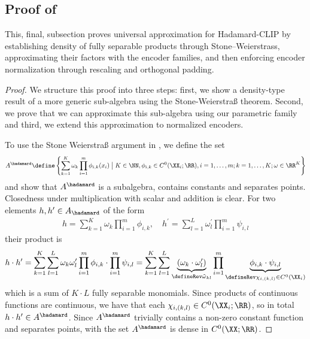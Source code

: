 \documentclass{article}
\begin{document}
\subsection{Proof of }
\label{thm:UniversalApproximationHadamardClip-PROOF}

This, final, subsection proves universal approximation for
Hadamard-CLIP by establishing density of fully separable products through
Stone--Weierstrass, approximating their factors with the encoder families, and
then enforcing encoder normalization through rescaling and orthogonal
padding.
\begin{proof} We structure this proof into three steps: first, we show a density-type result
 of a more generic sub-algebra using the Stone-Weierstraß theorem. Second, we prove
 that we can approximate this sub-algebra using our parametric family and third,
 we extend this approximation to normalized encoders.

  To use the Stone Weierstraß argument in
 , we define the set
 \begin{align*}
  A^{\hadamard} \define \left\{
  \sum_{k=1}^K \omega_k \prod_{i=1}^m  \phi_{i,k}(x_i) \; \big\vert \;
  K\in \NN, \phi_{i,k} \in C^0(\XX_i; \RR), i=1,\ldots, m; k=1,\ldots, K;
  \omega \in \RR^{K}
  \right\}
 \end{align*}
 and show that $A^{\hadamard}$ is a subalgebra, contains constants and separates points.
 Closedness under multiplication with scalar and addition is clear. For two elements
 $h, h^\prime \in A_{\hadamard}$ of the form
 \begin{align*}
  h = \sum_{k=1}^K \omega_k \prod_{i=1}^{m} \phi_{i,k}, \quad
  h^\prime = \sum_{l=1}^{L} \omega_l^\prime \prod_{i=1}^{m} \psi_{i,l}
 \end{align*}
 their product is
 \begin{align*}
  h \cdot h^\prime  = \sum_{k=1}^{K} \sum_{l=1}^{L} \omega_k \omega^\prime_l
  \prod_{i=1}^{m} \phi_{i,k} \cdot \prod_{i=1}^{m}\psi_{i,l}
  = \sum_{k=1}^{K} \sum_{l=1}^{L} \underbrace{(\omega_k
   \cdot \omega_l^\prime)}_{\defineRev \tilde{\omega}_{kl}}
  \prod_{i=1}^{m} \underbrace{\phi_{i,k} \cdot \psi_{i,l}}_{\defineRev \chi_{i, (k,l)}
   \in C^0(\XX_i)}
 \end{align*}
 which is a sum of $K\cdot L$ fully separable monomials. Since products of continuous
 functions are continuous, we have that each $\chi_{i,(k,l)} \in C^0(\XX_i;\RR)$, so
 in total $h \cdot h^\prime \in A^{\hadamard}$. Since $A^{\hadamard}$ trivially
 contains a non-zero constant function and separates points, with
  the set $A^{\hadamard}$ is dense in $C^0(\XX;\RR)$.


\end{proof}
\end{document}
